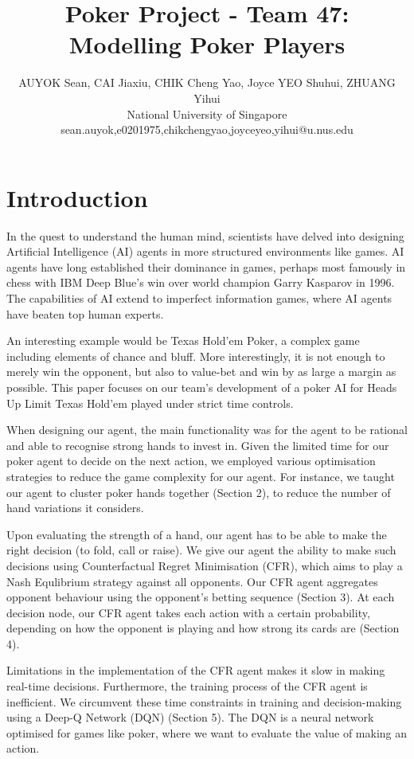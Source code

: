 \documentclass{article}
\title{Poker Project - Team 47: Modelling Poker Players}
\author{
AUYOK Sean, CAI Jiaxiu, CHIK Cheng Yao, Joyce YEO Shuhui, ZHUANG Yihui
\\ 
National University of Singapore\\
sean.auyok,e0201975,chikchengyao,joyceyeo,yihui@u.nus.edu
}
\begin{document}
\maketitle

\section{Introduction}
In the quest to understand the human mind, scientists have delved into designing Artificial Intelligence (AI) agents in more structured environments like games. AI agents have long established their dominance in games, perhaps most famously in chess with IBM Deep Blue's win over world champion Garry Kasparov in 1996. %
The capabilities of AI extend to imperfect information games, where AI agents have beaten top human experts. 

An interesting example would be Texas Hold'em Poker, a complex game including elements of chance and bluff. More interestingly, it is not enough to merely win the opponent, but also to value-bet and win by as large a margin as possible. This paper focuses on our team's development of a poker AI for Heads Up Limit Texas Hold'em played under strict time controls. 

When designing our agent, the main functionality was for the agent to be rational and able to recognise strong hands to invest in. Given the limited time for our poker agent to decide on the next action, we employed various optimisation strategies to reduce the game complexity for our agent. For instance, we taught our agent to cluster poker hands together (Section 2), to reduce the number of hand variations it considers.

Upon evaluating the strength of a hand, our agent has to be able to make the right decision (to fold, call or raise). We give our agent the ability to make such decisions using Counterfactual Regret Minimisation (CFR), which aims to play a Nash Equlibrium strategy against all opponents. Our CFR agent aggregates opponent behaviour using the opponent's betting sequence (Section 3). At each decision node, our CFR agent takes each action with a certain probability, depending on how the opponent is playing and how strong its cards are (Section 4).

Limitations in the implementation of the CFR agent makes it slow in making real-time decisions. Furthermore, the training process of the CFR agent is inefficient. We circumvent these time constraints in training and decision-making using a Deep-Q Network (DQN) (Section 5). The DQN is a neural network optimised for games like poker, where we want to evaluate the value of making an action.
\end{document}
